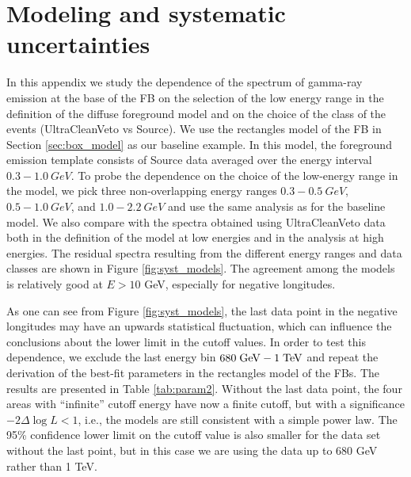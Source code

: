 \section{Modeling and systematic uncertainties}

In this appendix we study the dependence of the spectrum of gamma-ray emission at the base of the FB
on the selection of the low energy range in the definition of the diffuse foreground model
and on the choice of the class of the events (UltraCleanVeto vs Source).
We use the rectangles model of the FB in Section \ref{sec:box_model}
as our baseline example.
In this model, the foreground emission template consists of Source data averaged over the energy interval $0.3 - \SI{1.0}{GeV}$. 
To probe the dependence on the choice of the low-energy range in the model, 
we pick three non-overlapping energy ranges $0.3 - \SI{0.5}{GeV}$, $0.5 - \SI{1.0}{GeV}$, and $1.0 - \SI{2.2}{GeV}$ 
and use the same analysis as for the baseline model. 
We also compare with the spectra obtained using UltraCleanVeto data both in the definition of the model
at low energies and in the analysis at high energies.
The residual spectra resulting from the different energy ranges and data classes are shown in Figure \ref{fig:syst_models}. 
The agreement among the models is relatively good at $E > 10$ GeV, especially for negative longitudes.

As one can see from Figure \ref{fig:syst_models}, the last data point in the negative longitudes may have an upwards statistical fluctuation,
which can influence the conclusions about the lower limit in the cutoff values.
In order to test this dependence, we exclude the last energy bin $680\;{\rm GeV} - 1\;{\rm TeV}$ and 
repeat the derivation of the best-fit parameters in the rectangles model of the FBs.
The results are presented in Table \ref{tab:param2}.
Without the last data point, the four areas with ``infinite'' cutoff energy have now a finite cutoff,
but with a significance $-2\Delta \log L  < 1$, i.e., the models are still consistent with a simple power law.
The 95\% confidence lower limit on the cutoff value is also smaller for the data set without the last point,
but in this case we are using the data up to 680 GeV rather than 1 TeV.

